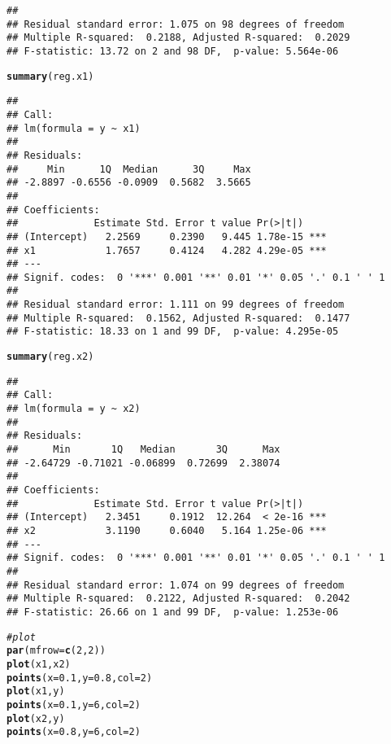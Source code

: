 \documentclass[12pt]{article}\usepackage[]{graphicx}\usepackage[]{color}
\makeatletter
\newcommand{\hlnum}[1]{\textcolor[rgb]{0.686,0.059,0.569}{#1}}%
\newcommand{\hlcom}[1]{\textcolor[rgb]{0.678,0.584,0.686}{\textit{#1}}}%
\newcommand{\hlstd}[1]{\textcolor[rgb]{0.345,0.345,0.345}{#1}}%
\newcommand{\hlkwc}[1]{\textcolor[rgb]{0.333,0.667,0.333}{#1}}%
\newcommand{\hlkwd}[1]{\textcolor[rgb]{0.737,0.353,0.396}{\textbf{#1}}}%
\newenvironment{kframe}{%
 \def\at@end@of@kframe{}%
 \ifinner\ifhmode%
  \def\at@end@of@kframe{\end{minipage}}%
  \begin{minipage}{\columnwidth}%
 \fi\fi%
 \def\FrameCommand##1{\hskip\@totalleftmargin \hskip-\fboxsep
 \colorbox{shadecolor}{##1}\hskip-\fboxsep
     \hskip-\linewidth \hskip-\@totalleftmargin \hskip\columnwidth}%
 \MakeFramed {\advance\hsize-\width
   \@totalleftmargin\z@ \linewidth\hsize
   \@setminipage}}%
 {\par\unskip\endMakeFramed%
 \at@end@of@kframe}
\newenvironment{knitrout}{}{} %
\theoremstyle{definition}
\makeatother
\begin{document}
\begin{enumerate}[1.]
\begin{enumerate}[(a)]
\begin{knitrout}
\begin{kframe}
\begin{verbatim}
## 
## Residual standard error: 1.075 on 98 degrees of freedom
## Multiple R-squared:  0.2188,	Adjusted R-squared:  0.2029 
## F-statistic: 13.72 on 2 and 98 DF,  p-value: 5.564e-06
\end{verbatim}
\begin{alltt}
\hlkwd{summary}\hlstd{(reg.x1)}
\end{alltt}
\begin{verbatim}
## 
## Call:
## lm(formula = y ~ x1)
## 
## Residuals:
##     Min      1Q  Median      3Q     Max 
## -2.8897 -0.6556 -0.0909  0.5682  3.5665 
## 
## Coefficients:
##             Estimate Std. Error t value Pr(>|t|)    
## (Intercept)   2.2569     0.2390   9.445 1.78e-15 ***
## x1            1.7657     0.4124   4.282 4.29e-05 ***
## ---
## Signif. codes:  0 '***' 0.001 '**' 0.01 '*' 0.05 '.' 0.1 ' ' 1
## 
## Residual standard error: 1.111 on 99 degrees of freedom
## Multiple R-squared:  0.1562,	Adjusted R-squared:  0.1477 
## F-statistic: 18.33 on 1 and 99 DF,  p-value: 4.295e-05
\end{verbatim}
\begin{alltt}
\hlkwd{summary}\hlstd{(reg.x2)}
\end{alltt}
\begin{verbatim}
## 
## Call:
## lm(formula = y ~ x2)
## 
## Residuals:
##      Min       1Q   Median       3Q      Max 
## -2.64729 -0.71021 -0.06899  0.72699  2.38074 
## 
## Coefficients:
##             Estimate Std. Error t value Pr(>|t|)    
## (Intercept)   2.3451     0.1912  12.264  < 2e-16 ***
## x2            3.1190     0.6040   5.164 1.25e-06 ***
## ---
## Signif. codes:  0 '***' 0.001 '**' 0.01 '*' 0.05 '.' 0.1 ' ' 1
## 
## Residual standard error: 1.074 on 99 degrees of freedom
## Multiple R-squared:  0.2122,	Adjusted R-squared:  0.2042 
## F-statistic: 26.66 on 1 and 99 DF,  p-value: 1.253e-06
\end{verbatim}
\begin{alltt}
\hlcom{# plot}
\hlkwd{par}\hlstd{(}\hlkwc{mfrow} \hlstd{=} \hlkwd{c}\hlstd{(}\hlnum{2}\hlstd{,}\hlnum{2}\hlstd{))}
\hlkwd{plot}\hlstd{(x1,x2)}
\hlkwd{points}\hlstd{(}\hlkwc{x} \hlstd{=} \hlnum{0.1}\hlstd{,} \hlkwc{y} \hlstd{=} \hlnum{0.8}\hlstd{,} \hlkwc{col} \hlstd{=} \hlnum{2}\hlstd{)}
\hlkwd{plot}\hlstd{(x1,y)}
\hlkwd{points}\hlstd{(}\hlkwc{x} \hlstd{=} \hlnum{0.1}\hlstd{,} \hlkwc{y} \hlstd{=} \hlnum{6}\hlstd{,} \hlkwc{col} \hlstd{=} \hlnum{2}\hlstd{)}
\hlkwd{plot}\hlstd{(x2,y)}
\hlkwd{points}\hlstd{(}\hlkwc{x} \hlstd{=} \hlnum{0.8}\hlstd{,} \hlkwc{y} \hlstd{=} \hlnum{6}\hlstd{,} \hlkwc{col} \hlstd{=} \hlnum{2}\hlstd{)}

\end{alltt}
\end{kframe}
\end{knitrout}
\end{enumerate}
\end{enumerate}
\end{document}
